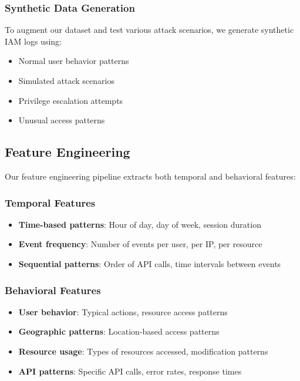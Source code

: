 \documentclass[conference]{IEEEtran}
\begin{document}
\subsubsection{Synthetic Data Generation}
To augment our dataset and test various attack scenarios, we generate synthetic IAM logs using:
\begin{itemize}
    \item Normal user behavior patterns
    \item Simulated attack scenarios
    \item Privilege escalation attempts
    \item Unusual access patterns
\end{itemize}

\subsection{Feature Engineering}
Our feature engineering pipeline extracts both temporal and behavioral features:

\subsubsection{Temporal Features}
\begin{itemize}
    \item \textbf{Time-based patterns}: Hour of day, day of week, session duration
    \item \textbf{Event frequency}: Number of events per user, per IP, per resource
    \item \textbf{Sequential patterns}: Order of API calls, time intervals between events
\end{itemize}

\subsubsection{Behavioral Features}
\begin{itemize}
    \item \textbf{User behavior}: Typical actions, resource access patterns
    \item \textbf{Geographic patterns}: Location-based access patterns
    \item \textbf{Resource usage}: Types of resources accessed, modification patterns
    \item \textbf{API patterns}: Specific API calls, error rates, response times
\end{itemize}
\end{document}
